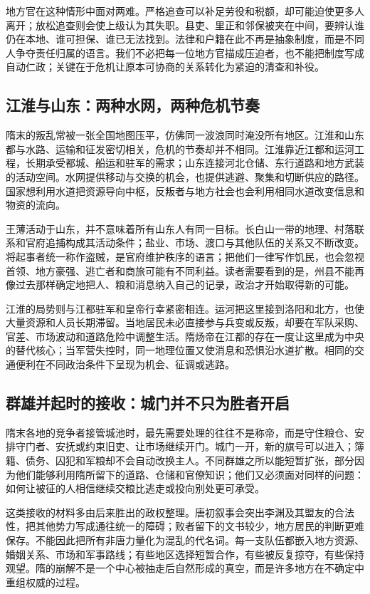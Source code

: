 地方官在这种情形中面对两难。严格追查可以补足劳役和税额，却可能迫使更多人离开；放松追查则会使上级认为其失职。县吏、里正和邻保被夹在中间，要辨认谁仍在本地、谁可担保、谁已无法找到。法律和户籍在此不再是抽象制度，而是不同人争夺责任归属的语言。我们不必把每一位地方官描成压迫者，也不能把制度写成自动仁政；关键在于危机让原本可协商的关系转化为紧迫的清查和补役。

\subsection{江淮与山东：两种水网，两种危机节奏}
隋末的叛乱常被一张全国地图压平，仿佛同一波浪同时淹没所有地区。江淮和山东都与水路、运输和征发密切相关，危机的节奏却并不相同。江淮靠近江都和运河工程，长期承受都城、船运和驻军的需求；山东连接河北仓储、东行道路和地方武装的活动空间。水网提供移动与交换的机会，也提供逃避、聚集和切断供应的路径。国家想利用水道把资源导向中枢，反叛者与地方社会也会利用相同水道改变信息和物资的流向。

王薄活动于山东，并不意味着所有山东人有同一目标。长白山一带的地理、村落联系和官府追捕构成其活动条件；盐业、市场、渡口与其他队伍的关系又不断改变。将起事者统一称作盗贼，是官府维护秩序的语言；把他们一律写作饥民，也会忽视首领、地方豪强、逃亡者和商旅可能有不同利益。读者需要看到的是，州县不能再像过去那样确定地把人、粮和消息纳入自己的记录，政治才开始取得新的可能。

江淮的局势则与江都驻军和皇帝行幸紧密相连。运河把这里接到洛阳和北方，也使大量资源和人员长期滞留。当地居民未必直接参与兵变或反叛，却要在军队采购、官差、市场波动和道路危险中调整生活。隋炀帝在江都的存在一度让这里成为中央的替代核心；当军营失控时，同一地理位置又使消息和恐惧沿水道扩散。相同的交通便利在不同政治条件下呈现为机会、征调或逃路。

\subsection{群雄并起时的接收：城门并不只为胜者开启}
隋末各地的竞争者接管城池时，最先需要处理的往往不是称帝，而是守住粮仓、安排守门者、安抚或约束旧吏、让市场继续开门。城门一开，新的旗号可以进入；簿籍、债务、囚犯和军粮却不会自动改换主人。不同群雄之所以能短暂扩张，部分因为他们能够利用隋所留下的道路、仓储和官僚知识；他们又必须面对同样的问题：如何让被征的人相信继续交粮比逃走或投向别处更可承受。

这类接收的材料多由后来胜出的政权整理。唐初叙事会突出李渊及其盟友的合法性，把其他势力写成通往统一的障碍；败者留下的文书较少，地方居民的判断更难保存。不能因此把所有非唐力量化为混乱的代名词。每一支队伍都嵌入地方资源、婚姻关系、市场和军事路线；有些地区选择短暂合作，有些被反复掠夺，有些保持观望。隋的崩解不是一个中心被抽走后自然形成的真空，而是许多地方在不确定中重组权威的过程。


